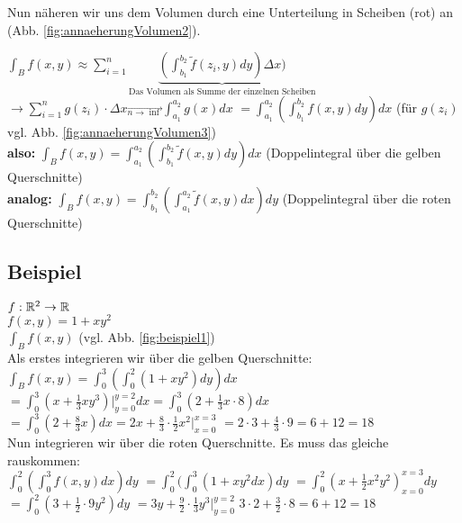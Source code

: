 
Nun näheren wir uns dem Volumen durch eine Unterteilung in Scheiben (rot) an (Abb. \ref{fig:annaeherungVolumen2}).

$ \int_{B} f(x,y) \approx \sum_{i=1}^{n} \underbrace{( \int_{b_1}^{b_2} \tilde{f} (z_i,y) dy ) \Delta x)}_{\textrm{Das Volumen als Summe der einzelnen Scheiben}} $
$ \rightarrow \sum_{i=1}^{n} g(z_i)\cdot \Delta x \overrightarrow{ _{n\rightarrow \inf}} \int_{a_1}^{a_2} g(x) dx $ 
$ = \int_{a_1}^{a_2} ( \int_{b_1}^{b_2} f(x,y)dy)dx $ (für $ g(z_i) $ vgl. Abb. \ref{fig:annaeherungVolumen3})\\
\textbf{also:}
$ \int_{B} f(x,y) = \int_{a_1}^{a_2} ( \int_{b_1}^{b_2} \tilde{f}(x,y)dy)dx $ (Doppelintegral über die gelben Querschnitte)\\

\textbf{analog:}
$ \int_{B} f(x,y) = \int_{b_1}^{b_2} ( \int_{a_1}^{a_2} \tilde{f}(x,y)dx ) dy $ (Doppelintegral über die roten Querschnitte)

\subsection{Beispiel} 

$ f: \mathbb{R}^2 \rightarrow \mathbb{R} $\\
$ f(x,y) = 1+xy^2 $\\
$ \int_B f(x,y) $ (vgl. Abb. \ref{fig:beispiel1})\\
Als erstes integrieren wir über die gelben Querschnitte:\\
$ \int_{B} f(x,y) = \int_0^3 ( \int_0^2 (1+xy^2) dy ) dx $
$ = \int_0^3 (x + \frac{1}{3} xy^3)|_{y=0}^{y=2} dx = \int_0^3 (2+\frac{1}{3} x\cdot 8) dx $
$ = \int_0^3 (2+ \frac{8}{3} x) dx = 2x+\frac{8}{3} \cdot \frac{1}{2} x^2 |_{x=0}^{x=3} $
$ = 2\cdot 3 + \frac{4}{3} \cdot 9 = 6+12=18 $\\
Nun integrieren wir über die roten Querschnitte. Es muss das gleiche rauskommen: \\
$ \int_0^2 ( \int_0^3 f(x,y)dx)dy $
$ = \int_0^2 ( \int_0^3 (1+xy^2 dx) dy $
$ = \int_0^2 ( x+\frac{1}{2}x^2y^2)_{x=0}^{x=3} dy $
$ = \int_0^2 (3+\frac{1}{2}\cdot 9 y^2)dy $
$ = 3y + \frac{9}{2} \cdot \frac{1}{3} y^3 |_{y=0}^{y=2} $
$ 3\cdot 2 + \frac{3}{2} \cdot 8 = 6+12=18 $


